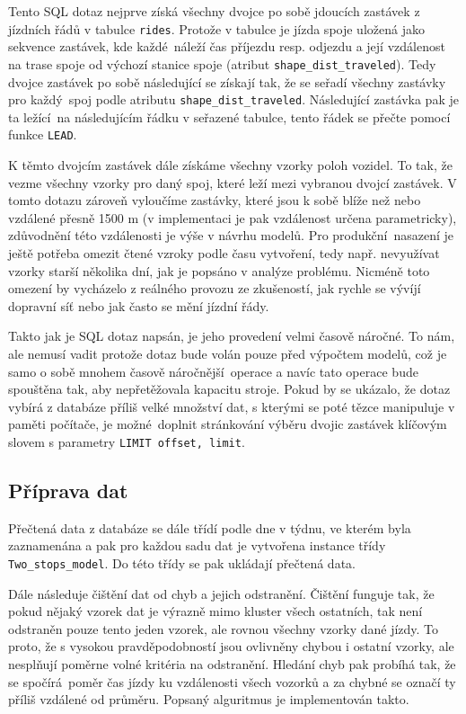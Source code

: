 Tento SQL dotaz nejprve získá všechny dvojce po sobě jdoucích zastávek z jízdních řádů v tabulce \verb-rides-. Protože v tabulce je jízda spoje uložená jako sekvence zastávek, kde každé náleží čas příjezdu resp. odjezdu a její vzdálenost na trase spoje od výchozí stanice spoje (atribut \verb-shape_dist_traveled-). Tedy dvojce zastávek po sobě následující se získají tak, že se seřadí všechny zastávky pro každý spoj podle atributu \verb-shape_dist_traveled-. Následující zastávka pak je ta ležící na následujícím řádku v seřazené tabulce, tento řádek se přečte pomocí funkce \verb-LEAD-.

\bigbreak

K těmto dvojcím zastávek dále získáme všechny vzorky poloh vozidel. To tak, že vezme všechny vzorky pro daný spoj, které leží mezi vybranou dvojcí zastávek. V tomto dotazu zároveň vyloučíme zastávky, které jsou k sobě blíže než nebo vzdálené přesně 1500 m (v implementaci je pak vzdálenost určena parametricky), zdůvodnění této vzdálenosti je výše v návrhu modelů. Pro produkční nasazení je ještě potřeba omezit čtené vzroky podle času vytvoření, tedy např. nevyužívat vzorky starší několika dní, jak je popsáno v analýze problému. Nicméně toto omezení by vycházelo z reálného provozu ze zkušeností, jak rychle se vývíjí dopravní síť nebo jak často se mění jízdní řády.

\bigbreak

Takto jak je SQL dotaz napsán, je jeho provedení velmi časově náročné. To nám, ale nemusí vadit protože dotaz bude volán pouze před výpočtem modelů, což je samo o sobě mnohem časově náročnější operace a navíc tato operace bude spouštěna tak, aby nepřetěžovala kapacitu stroje. Pokud by se ukázalo, že dotaz vybírá z databáze příliš velké množství dat, s kterými se poté tězce manipuluje v paměti počítače, je možné doplnit stránkování výběru dvojic zastávek klíčovým slovem s parametry \verb-LIMIT offset, limit-.

\subsection{Příprava dat}

Přečtená data z databáze se dále třídí podle dne v týdnu, ve kterém byla zaznamenána a pak pro každou sadu dat je vytvořena instance třídy \verb-Two_stops_model-. Do této třídy se pak ukládají přečtená data.

\bigbreak

Dále následuje čištění dat od chyb a jejich odstranění. Čištění funguje tak, že pokud nějaký vzorek dat je výrazně mimo kluster všech ostatních, tak není odstraněn pouze tento jeden vzorek, ale rovnou všechny vzorky dané jízdy. To proto, že s vysokou pravděpodobností jsou ovlivněny chybou i ostatní vzorky, ale nesplňují poměrne volné kritéria na odstranění. Hledání chyb pak probíhá tak, že se spočírá poměr čas jízdy ku vzdálenosti všech vozorků a za chybné se označí ty příliš vzdálené od průměru. Popsaný alguritmus je implementován takto.


